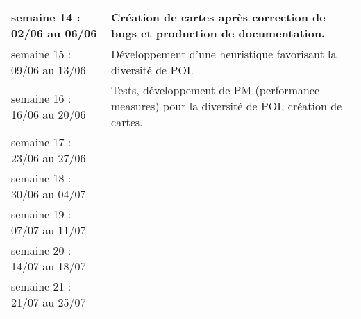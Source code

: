 \begin{longtable}[H]{| m{5cm} | m{10cm} |}
\hline
semaine 14 : 02/06 au 06/06 & Création de cartes après correction de bugs et production de documentation.\\
\hline
semaine 15 : 09/06 au 13/06 & Développement d'une heuristique favorisant la diversité de POI. \\
\hline
semaine 16 : 16/06 au 20/06 & Tests, développement de PM (performance measures) pour la diversité de POI, création de cartes. \\
\hline
semaine 17 : 23/06 au 27/06 & \\
\hline
semaine 18 : 30/06 au 04/07 & \\
\hline
semaine 19 : 07/07 au 11/07 & \\
\hline
semaine 20 : 14/07 au 18/07 & \\
\hline
semaine 21 : 21/07 au 25/07 & \\
\end{longtable}